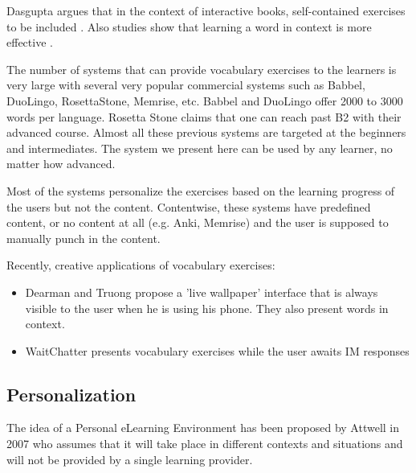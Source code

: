Dasgupta argues that in the context of interactive books, self-contained exercises to be included \cite{Dasgupta10-Play}. Also studies show that learning a word in context is more effective \cite{nagy95-context}.


The number of systems that can provide vocabulary exercises to the learners is very large with several very popular commercial systems such as Babbel, DuoLingo, RosettaStone, Memrise, etc. 
Babbel and DuoLingo offer 2000 to 3000 words per language. 
Rosetta Stone claims that one can reach past B2 with their advanced course. 
Almost all these previous systems are targeted at the beginners and intermediates.
The system we present here can be used by any learner, no matter how advanced. 

Most of the systems personalize the exercises based on the learning progress of the users but not the content. Contentwise, these systems have predefined content, or no content at all (e.g. Anki, Memrise) and the user is supposed to manually punch in the content. 


Recently, creative applications of vocabulary exercises:

\begin{itemize}

	\item \cite{Dear12-ImplicitAcquisition} Dearman and Truong propose a 'live wallpaper' interface that is always visible to the user when he is using his phone. They also present words in context. 

	\item \cite{Cai15-wait} WaitChatter presents vocabulary exercises while the user awaits IM responses

\end{itemize}




\subsection{Personalization}

The idea of a Personal eLearning Environment has been proposed by Attwell in 2007 \cite{Atwell07-personal} who assumes that it will take place in different contexts and situations and will not be provided by a single learning provider.

